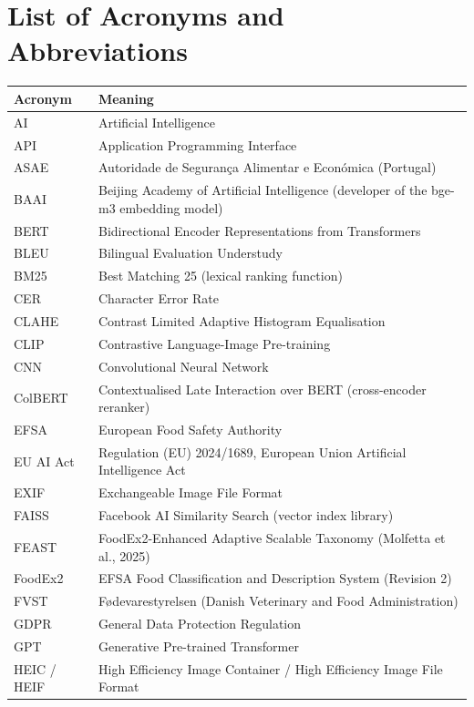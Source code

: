 \chapter*{List of Acronyms and Abbreviations}

\begin{longtable}{@{}p{}p{}@{}}
\toprule
\textbf{Acronym} & \textbf{Meaning}\\
\midrule
\endhead
AI & Artificial Intelligence\\
API & Application Programming Interface\\
ASAE & Autoridade de Segurança Alimentar e Económica (Portugal)\\
BAAI & Beijing Academy of Artificial Intelligence (developer of the bge-m3 embedding model)\\
BERT & Bidirectional Encoder Representations from Transformers\\
BLEU & Bilingual Evaluation Understudy\\
BM25 & Best Matching 25 (lexical ranking function)\\
CER & Character Error Rate\\
CLAHE & Contrast Limited Adaptive Histogram Equalisation\\
CLIP & Contrastive Language-Image Pre-training\\
CNN & Convolutional Neural Network\\
ColBERT & Contextualised Late Interaction over BERT (cross-encoder reranker)\\
EFSA & European Food Safety Authority\\
EU AI Act & Regulation (EU) 2024/1689, European Union Artificial Intelligence Act\\
EXIF & Exchangeable Image File Format\\
FAISS & Facebook AI Similarity Search (vector index library)\\
FEAST & FoodEx2-Enhanced Adaptive Scalable Taxonomy (Molfetta et al., 2025)\\
FoodEx2 & EFSA Food Classification and Description System (Revision 2)\\
FVST & Fødevarestyrelsen (Danish Veterinary and Food Administration)\\
GDPR & General Data Protection Regulation\\
GPT & Generative Pre-trained Transformer\\
HEIC / HEIF & High Efficiency Image Container / High Efficiency Image File Format\\

\end{longtable}
